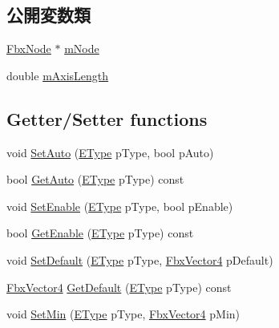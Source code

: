 \subsection*{公開変数類}
\begin{DoxyCompactItemize}
\item 
\hyperlink{class_fbx_node}{Fbx\+Node} $\ast$ \hyperlink{class_fbx_limits_utilities_aa0edad5da0f8d55bf0ada0b8268d7b17}{m\+Node}
\item 
double \hyperlink{class_fbx_limits_utilities_adb006b0fb0202573d3401021d860a66f}{m\+Axis\+Length}
\end{DoxyCompactItemize}
\subsection*{Getter/\+Setter functions}
\begin{DoxyCompactItemize}
\item 
void \hyperlink{class_fbx_limits_utilities_a290ae79085beea63b37f3a9953e03709}{Set\+Auto} (\hyperlink{class_fbx_limits_utilities_aa55167751039b3d64b56cb7e58f2e62c}{E\+Type} p\+Type, bool p\+Auto)
\item 
bool \hyperlink{class_fbx_limits_utilities_a299f897153503e07a28b512fb05ed408}{Get\+Auto} (\hyperlink{class_fbx_limits_utilities_aa55167751039b3d64b56cb7e58f2e62c}{E\+Type} p\+Type) const
\item 
void \hyperlink{class_fbx_limits_utilities_a304ea11e6242e4212c625843a4ef23f8}{Set\+Enable} (\hyperlink{class_fbx_limits_utilities_aa55167751039b3d64b56cb7e58f2e62c}{E\+Type} p\+Type, bool p\+Enable)
\item 
bool \hyperlink{class_fbx_limits_utilities_a3224344ce5636d18f22d8ec8a327bba6}{Get\+Enable} (\hyperlink{class_fbx_limits_utilities_aa55167751039b3d64b56cb7e58f2e62c}{E\+Type} p\+Type) const
\item 
void \hyperlink{class_fbx_limits_utilities_a89d6cb2e0dcdc0fc12f520a9b1ea9326}{Set\+Default} (\hyperlink{class_fbx_limits_utilities_aa55167751039b3d64b56cb7e58f2e62c}{E\+Type} p\+Type, \hyperlink{class_fbx_vector4}{Fbx\+Vector4} p\+Default)
\item 
\hyperlink{class_fbx_vector4}{Fbx\+Vector4} \hyperlink{class_fbx_limits_utilities_abe24c72b27fe512b2e1ea982b804d423}{Get\+Default} (\hyperlink{class_fbx_limits_utilities_aa55167751039b3d64b56cb7e58f2e62c}{E\+Type} p\+Type) const
\item 
void \hyperlink{class_fbx_limits_utilities_a27850a4e588581e0130a2634c518665a}{Set\+Min} (\hyperlink{class_fbx_limits_utilities_aa55167751039b3d64b56cb7e58f2e62c}{E\+Type} p\+Type, \hyperlink{class_fbx_vector4}{Fbx\+Vector4} p\+Min)

\end{DoxyCompactItemize}
